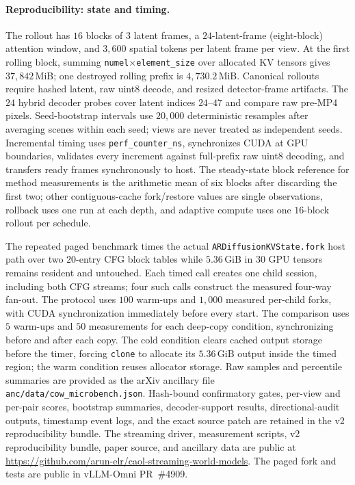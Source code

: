\documentclass[11pt]{article}
\begin{document}
\paragraph{Reproducibility: state and timing.}
The rollout has $16$ blocks of $3$ latent frames, a $24$-latent-frame (eight-block) attention window, and $3{,}600$ spatial tokens per latent frame per view. At the first rolling block, summing \texttt{numel}$\times$\texttt{element\_size} over allocated KV tensors gives $37{,}842$\,MiB; one destroyed rolling prefix is $4{,}730.2$\,MiB. Canonical rollouts require hashed latent, raw uint8 decode, and resized detector-frame artifacts. The $24$ hybrid decoder probes cover latent indices $24$--$47$ and compare raw pre-MP4 pixels. Seed-bootstrap intervals use $20{,}000$ deterministic resamples after averaging scenes within each seed; views are never treated as independent seeds. Incremental timing uses \texttt{perf\_counter\_ns}, synchronizes CUDA at GPU boundaries, validates every increment against full-prefix raw uint8 decoding, and transfers ready frames synchronously to host. The steady-state block reference for method measurements is the arithmetic mean of six blocks after discarding the first two; other contiguous-cache fork/restore values are single observations, rollback uses one run at each depth, and adaptive compute uses one $16$-block rollout per schedule.

The repeated paged benchmark times the actual \texttt{ARDiffusionKVState.fork} host path over two $20$-entry CFG block tables while $5.36$\,GiB in $30$ GPU tensors remains resident and untouched. Each timed call creates one child session, including both CFG streams; four such calls construct the measured four-way fan-out. The protocol uses $100$ warm-ups and $1{,}000$ measured per-child forks, with CUDA synchronization immediately before every start. The comparison uses $5$ warm-ups and $50$ measurements for each deep-copy condition, synchronizing before and after each copy. The cold condition clears cached output storage before the timer, forcing \texttt{clone} to allocate its $5.36$\,GiB output inside the timed region; the warm condition reuses allocator storage. Raw samples and percentile summaries are provided as the arXiv ancillary file \texttt{anc/data/cow\_microbench.json}. Hash-bound confirmatory gates, per-view and per-pair scores, bootstrap summaries, decoder-support results, directional-audit outputs, timestamp event logs, and the exact source patch are retained in the v2 reproducibility bundle. The streaming driver, measurement scripts, v2 reproducibility bundle, paper source, and ancillary data are public at \url{https://github.com/arun-elr/caol-streaming-world-models}. The paged fork and tests are public in vLLM-Omni PR~\#4909.
\end{document}
